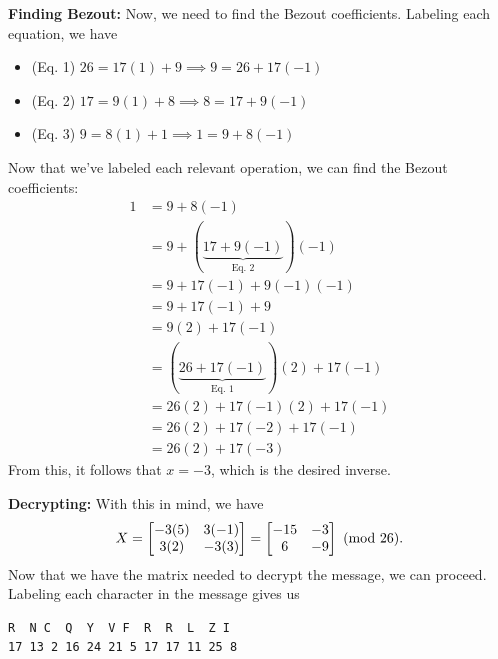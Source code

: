 \documentclass[letterpaper]{article}
\begin{document}
\begin{mdframed}
\begin{mdframed}
        \textbf{Finding Bezout:} Now, we need to find the Bezout coefficients. Labeling each equation, we have 
        \begin{itemize}
            \item (Eq. 1) $26 = 17(1) + 9 \implies 9 = 26 + 17(-1)$ 
            \item (Eq. 2) $17 = 9(1) + 8 \implies 8 = 17 + 9(-1)$
            \item (Eq. 3) $9 = 8(1) + 1 \implies 1 = 9 + 8(-1)$ 
        \end{itemize}
        Now that we've labeled each relevant operation, we can find the Bezout coefficients: 
        \begin{equation*}
            \begin{aligned}
                1 &= 9 + 8(-1) \\ 
                    &= 9 + (\underbrace{17 + 9(-1)}_{\text{Eq. 2}})(-1) \\ 
                    &= 9 + 17(-1) + 9(-1)(-1) \\ 
                    &= 9 + 17(-1) + 9 \\ 
                    &= 9(2) + 17(-1) \\ 
                    &= (\underbrace{26 + 17(-1)}_{\text{Eq. 1}})(2) + 17(-1) \\ 
                    &= 26(2) + 17(-1)(2) + 17(-1) \\ 
                    &= 26(2) + 17(-2) + 17(-1) \\ 
                    &= 26(2) + 17(-3)
            \end{aligned}
        \end{equation*}
        From this, it follows that $x = -3$, which is the desired inverse.  

        \bigskip 

        \textbf{Decrypting:} With this in mind, we have 
        \[X = \begin{bmatrix}
            -3(5) & 3(-1) \\ 3(2) & -3(3)
        \end{bmatrix} = \begin{bmatrix}
            -15 & -3 \\ 6 & -9
        \end{bmatrix} \ (\mathrm{mod}\ 26).\]
        Now that we have the matrix needed to decrypt the message, we can proceed. Labeling each character in the message gives us 
        \begin{mdframed}
            \begin{verbatim}
R  N C  Q  Y  V F  R  R  L  Z I
17 13 2 16 24 21 5 17 17 11 25 8\end{verbatim}
        \end{mdframed}
    \end{mdframed}


\end{mdframed}
\end{document}
